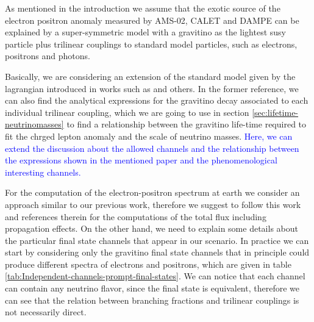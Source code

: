 \documentclass[a4paper,11pt]{article}
\newcommand*{\blue}{\textcolor{blue}}
\begin{document}
As mentioned in the introduction we assume that the exotic source of the electron positron anomaly measured by AMS-02, CALET and DAMPE can be explained by a super-symmetric model with a gravitino as the lightest susy particle plus trilinear couplings to standard model particles, such
as electrons, positrons and photons. 

Basically, we are considering an extension of the standard model given by the lagrangian introduced in
works such as \cite{Moreau:2001sr} and others. In the former reference, we can also find the analytical expressions for the gravitino decay associated to each individual trilinear coupling, which we are going to use in section \ref{sec:lifetime-neutrinomasses} to find a relationship between the gravitino life-time required to fit the chrged lepton anomaly and the scale of neutrino masses. \blue{Here, we can extend the discussion about the allowed channels and the relationship between the expressions shown
in the mentioned paper and the phenomenological interesting channels.}

For the computation of the electron-positron spectrum at earth we consider an approach similar to our previous work, therefore we suggest to follow this work and references therein for the computations of the total flux including propagation effects. On the other hand, we need to explain some details about the particular final state channels that appear in our scenario. In practice we can start by considering only the gravitino final state channels that in principle could produce different spectra of electrons and positrons, which are given in table \ref{tab:Independent-channels-prompt-final-states}. We can notice that each channel can contain any neutrino flavor, since the final state is equivalent, therefore we can see that the relation between branching fractions and trilinear couplings is not necessarily direct.
\end{document}
